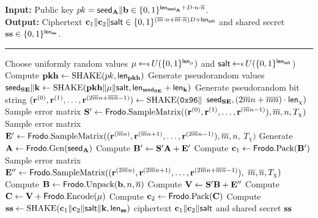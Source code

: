\begin{algorithm}[t]
\caption{\label{alg:KEM:Encaps} $\FrodoKEM.\Encaps$.}
{\bf Input:} Public key $\pk = \seedA\| \bfb \in \{0,1\}^{\lengthseedA + D\cdot n \cdot \nbar}$.\\
{\bf Output:} Ciphertext $\bfc_1\| \bfc_2{\color{black}\| \salt}\in \{0,1\}^{(\mbar\cdot n +\mbar\cdot\nbar)D{\color{black}+\lengthsalt}}$ and shared secret $\ssk \in \{0,1\}^\lengthss$.\\[-1.5ex]
\rule{\linewidth}{.5pt}
\vspace{-0.5cm}
\begin{algorithmic}[1]
    \STATE Choose uniformly random values $\mu \getsr U(\{0,1\}^\lengthm)$ {\color{black}and $\salt \getsr U(\{0,1\}^\lengthsalt$)}
    \STATE Compute $\pkh \gets \SHAKE(\pk, \lengthpkhash)$
    \STATE Generate pseudorandom values $\seedSE\| \bfk \gets \SHAKE(\pkh \| \mu{\color{black}\| \salt}, \lengthseedSE + \lengthK)$
    \STATE Generate pseudorandom bit string $ (\bfr^{(0)}, \bfr^{(1)}, \dots, \bfr^{(2\mbar n+\mbar\nbar-1)}) \gets \SHAKE(\mathtt{0x96} \|$ $\seedSE, (2\mbar n+\mbar\nbar) \cdot \lengthchi)$
    \STATE Sample error matrix $\bfS' \gets \Frodo.\SampV((\bfr^{(0)}, \bfr^{(1)}, \dots, \bfr^{(\mbar n-1)}), \mbar, n, T_\chi)$
    \STATE Sample error matrix $\bfE' \gets \Frodo.\SampV((\bfr^{(\mbar n)}, \bfr^{(\mbar n+1)}, \dots, \bfr^{(2\mbar n-1)}), \mbar, n,$ $T_\chi)$
    \STATE Generate $\bfA\gets \Frodo.\gen(\seedA)$
    \STATE Compute $\bfB' \gets \bfS'\bfA + \bfE'$
    \STATE Compute $\bfc_1 \gets \Frodo.\Pack(\bfB')$
    \STATE Sample error matrix $\bfE'' \gets \Frodo.\SampV((\bfr^{(2\mbar n)}, \bfr^{(2\mbar n+1)}, \dots, \bfr^{(2\mbar n+\mbar\nbar-1)}),$ $\mbar, \nbar, T_\chi)$
    \STATE Compute $\bfB \gets \Frodo.\Unpack(\bfb,n,\nbar)$
    \STATE Compute $\bfV \gets \bfS'\bfB + \bfE''$
    \STATE Compute $\bfC \gets \bfV + \Frodo.\Encode(\mu)$
    \STATE Compute $\bfc_2 \gets \Frodo.\Pack(\bfC)$
    \STATE Compute $\ssk \gets \SHAKE(\bfc_1 \| \bfc_2{\color{black}\| \salt} \| \bfk, \lengthss)$
    \RETURN ciphertext $\bfc_1 \| \bfc_2{\color{black}\| \salt}$ and shared secret $\ssk$
    \end{algorithmic}
\end{algorithm}

